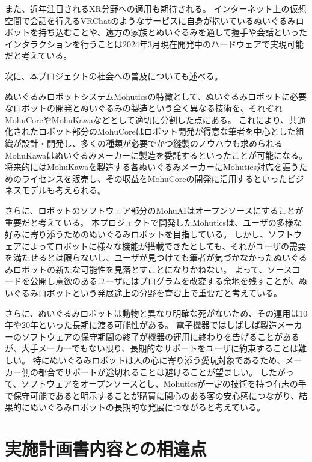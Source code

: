 \documentclass[uplatex,a4paper,12pt]{jsarticle}
\begin{document}
また、近年注目されるXR分野への適用も期待される。
インターネット上の仮想空間で会話を行えるVRChatのようなサービスに自身が抱いているぬいぐるみロボットを持ち込むことや、遠方の家族とぬいぐるみを通して握手や会話といったインタラクションを行うことは2024年3月現在開発中のハードウェアで実現可能だと考えている。

次に、本プロジェクトの社会への普及についても述べる。

ぬいぐるみロボットシステムMohuticsの特徴として、ぬいぐるみロボットに必要なロボットの開発とぬいぐるみの製造という全く異なる技術を、それぞれMohuCoreやMohuKawaなどとして適切に分割した点にある。
これにより、共通化されたロボット部分のMohuCoreはロボット開発が得意な筆者を中心とした組織が設計・開発し、多くの種類が必要でかつ縫製のノウハウも求められるMohuKawaはぬいぐるみメーカーに製造を委託するといったことが可能になる。
将来的にはMohuKawaを製造する各ぬいぐるみメーカーにMohutics対応を謳うためのライセンスを販売し、その収益をMohuCoreの開発に活用するといったビジネスモデルも考えられる。

さらに、ロボットのソフトウェア部分のMohuAIはオープンソースにすることが重要だと考えている。
本プロジェクトで開発したMohuticsは、ユーザの多様な好みに寄り添うためのぬいぐるみロボットを目指している。
しかし、ソフトウェアによってロボットに様々な機能が搭載できたとしても、それがユーザの需要を満たせるとは限らないし、ユーザが見つけても筆者が気づかなかったぬいぐるみロボットの新たな可能性を見落とすことになりかねない。
よって、ソースコードを公開し意欲のあるユーザにはプログラムを改変する余地を残すことが、ぬいぐるみロボットという発展途上の分野を育む上で重要だと考えている。

さらに、ぬいぐるみロボットは動物と異なり明確な死がないため、その運用は10年や20年といった長期に渡る可能性がある。
電子機器ではしばしば製造メーカーのソフトウェアの保守期間の終了が機器の運用に終わりを告げることがあるが、大手メーカーでもない限り、長期的なサポートをユーザに約束することは難しい。
特にぬいぐるみロボットは人の心に寄り添う愛玩対象であるため、メーカー側の都合でサポートが途切れることは避けることが望ましい。
したがって、ソフトウェアをオープンソースとし、Mohuticsが一定の技術を持つ有志の手で保守可能であると明示することが購買に関心のある客の安心感につながり、結果的にぬいぐるみロボットの長期的な発展につながると考えている。


\section{実施計画書内容との相違点}


\end{document}
